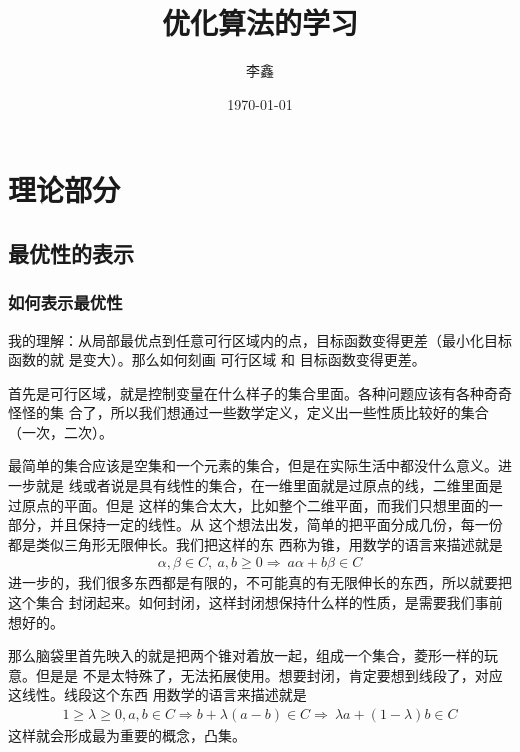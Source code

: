 \documentclass[UTF8]{ctexbook}
\begin{document}
\title{优化算法的学习}

\author{李鑫}

\date{\today}

\maketitle
\tableofcontents

\mainmatter %

\part{理论部分}

\chapter{最优性的表示}

\section{如何表示最优性}

我的理解：从局部最优点到任意可行区域内的点，目标函数变得更差（最小化目标函数的就
是变大）。那么如何刻画 \textsf{可行区域} 和 \textsf{目标函数变得更差}。

首先是可行区域，就是控制变量在什么样子的集合里面。各种问题应该有各种奇奇怪怪的集
合了，所以我们想通过一些数学定义，定义出一些性质比较好的集合（一次，二次）。

最简单的集合应该是空集和一个元素的集合，但是在实际生活中都没什么意义。进一步就是
线或者说是具有线性的集合，在一维里面就是过原点的线，二维里面是过原点的平面。但是
这样的集合太大，比如整个二维平面，而我们只想里面的一部分，并且保持一定的线性。从
这个想法出发，简单的把平面分成几份，每一份都是类似三角形无限伸长。我们把这样的东
西称为锥，用数学的语言来描述就是
\begin{align}
 \alpha  ,    \beta \in C, \ a,  b \ge 0 \Rightarrow \  a \alpha + b \beta \in C
\end{align}
进一步的，我们很多东西都是有限的，不可能真的有无限伸长的东西，所以就要把这个集合
封闭起来。如何封闭，这样封闭想保持什么样的性质，是需要我们事前想好的。

那么脑袋里首先映入的就是把两个锥对着放一起，组成一个集合，菱形一样的玩意。但是是
不是太特殊了，无法拓展使用。想要封闭，肯定要想到线段了，对应这线性。线段这个东西
用数学的语言来描述就是
\begin{align}
1 \ge  \lambda \ge 0, a, b \in C  \Rightarrow b + \lambda ( a-b ) \in C  \Rightarrow \  \lambda a + ( 1-\lambda ) b \in C 
\end{align}
这样就会形成最为重要的概念，凸集。
\end{document}
